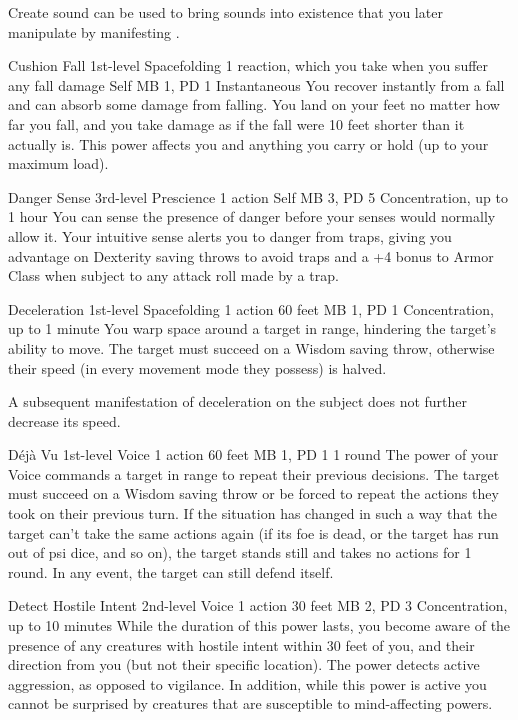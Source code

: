   Create sound can be used to bring sounds into existence that you later
  manipulate by manifesting .

\DndPowerHeader%
  {Cushion Fall}
  {1st-level Spacefolding}
  {1 reaction, which you take when you suffer any fall damage}
  {Self}
  {MB 1, PD 1}
  {Instantaneous}
  You recover instantly from a fall
  and can absorb some damage from falling.
  You land on your feet no matter how far you fall,
  and you take damage as if the fall were
  10 feet shorter than it actually is.
  This power affects you and anything you carry or hold
  (up to your maximum load).

\DndPowerHeader%
  {Danger Sense}
  {3rd-level Prescience}
  {1 action}
  {Self}
  {MB 3, PD 5}
  {Concentration, up to 1 hour}
  You can sense the presence of danger
  before your senses would normally allow it.
  Your intuitive sense alerts you to danger from traps,
  giving you advantage on Dexterity saving throws to avoid traps
  and a +4 bonus to Armor Class when subject to any attack roll
  made by a trap.

\DndPowerHeader%
  {Deceleration}
  {1st-level Spacefolding}
  {1 action}
  {60 feet}
  {MB 1, PD 1}
  {Concentration, up to 1 minute}
You warp space around a target in range,
hindering the target's ability to move.
The target must succeed on a Wisdom saving throw,
otherwise their speed (in every movement mode they possess) is halved.

A subsequent manifestation of deceleration on the subject
does not further decrease its speed.

\DndPowerHeader%
  {Déjà Vu}
  {1st-level Voice}
  {1 action}
  {60 feet}
  {MB 1, PD 1}
  {1 round}
The power of your Voice commands a target in range
to repeat their previous decisions.
The target must succeed on a Wisdom saving throw
or be forced to repeat the actions they took on their previous turn.
If the situation has changed in such a way that the target
can't take the same actions again
(if its foe is dead, or the target has run out of psi dice, and so on),
the target stands still and takes no actions for 1 round.
In any event, the target can still defend itself.

\DndPowerHeader%
  {Detect Hostile Intent}
  {2nd-level Voice}
  {1 action}
  {30 feet}
  {MB 2, PD 3}
  {Concentration, up to 10 minutes}
  While the duration of this power lasts,
  you become aware of the presence of any creatures with hostile intent
  within 30 feet of you,
  and their direction from you
  (but not their specific location).
  The power detects active aggression,
  as opposed to vigilance.
  In addition, while this power is active you cannot be surprised
  by creatures that are susceptible to mind-affecting powers.

